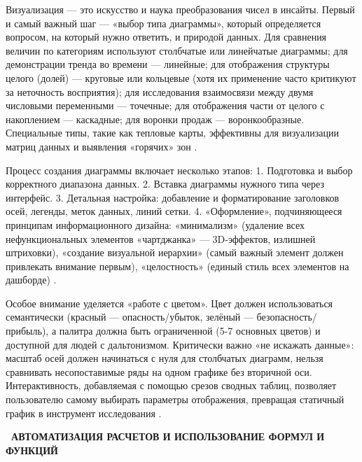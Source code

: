 \documentclass{SibFU-docs}
\begin{document}
Визуализация --- это искусство и наука преобразования чисел в инсайты. Первый и самый важный шаг --- «выбор типа диаграммы», который определяется вопросом, на который нужно ответить, и природой данных. Для сравнения величин по категориям используют столбчатые или линейчатые диаграммы; для демонстрации тренда во времени --- линейные; для отображения структуры целого (долей) --- круговые или кольцевые (хотя их применение часто критикуют за неточность восприятия); для исследования взаимосвязи между двумя числовыми переменными --- точечные; для отображения части от целого с накоплением --- каскадные; для воронки продаж --- воронкообразные. Специальные типы, такие как тепловые карты, эффективны для визуализации матриц данных и выявления «горячих» зон \cite{alexander_excel_charts_2016, intellezy_excel_vs_sheets_2024}.

Процесс создания диаграммы включает несколько этапов: 1. Подготовка и выбор корректного диапазона данных. 2. Вставка диаграммы нужного типа через интерфейс. 3. Детальная настройка: добавление и форматирование заголовков осей, легенды, меток данных, линий сетки. 4. «Оформление», подчиняющееся принципам информационного дизайна: «минимализм» (удаление всех нефункциональных элементов «чартджанка» --- 3D-эффектов, излишней штриховки), «создание визуальной иерархии» (самый важный элемент должен привлекать внимание первым), «целостность» (единый стиль всех элементов на дашборде) \cite{alexander_excel_charts_2016}.

Особое внимание уделяется «работе с цветом». Цвет должен использоваться семантически (красный --- опасность/убыток, зелёный --- безопасность/прибыль), а палитра должна быть ограниченной (5-7 основных цветов) и доступной для людей с дальтонизмом. Критически важно «не искажать данные»: масштаб осей должен начинаться с нуля для столбчатых диаграмм, нельзя сравнивать несопоставимые ряды на одном графике без вторичной оси. Интерактивность, добавляемая с помощью срезов сводных таблиц, позволяет пользователю самому выбирать параметры отображения, превращая статичный график в инструмент исследования \cite{alexander_excel_charts_2016}.

\newpage
{}
\begin{center}\textbf{\thesection\ АВТОМАТИЗАЦИЯ РАСЧЕТОВ И ИСПОЛЬЗОВАНИЕ ФОРМУЛ И ФУНКЦИЙ}\end{center}
\vspace*{-1.5em}
\end{document}
